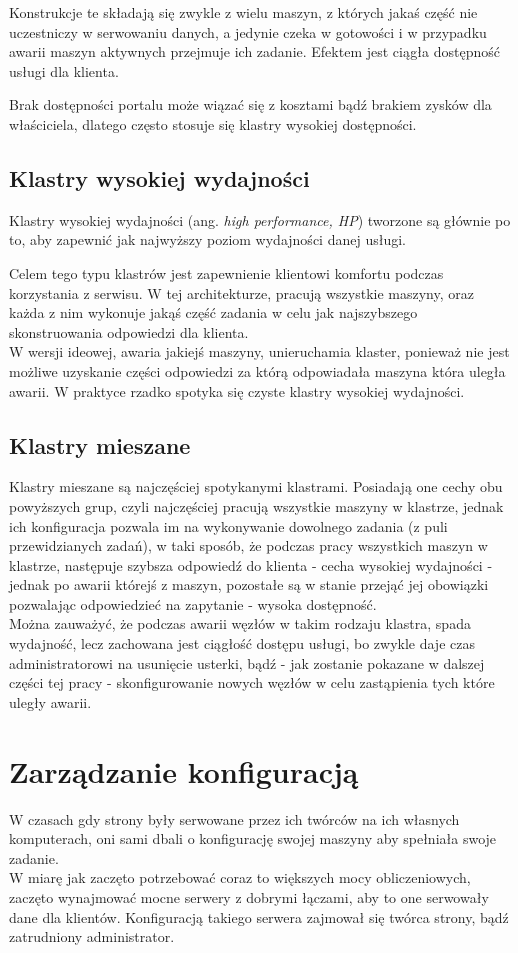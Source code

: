 Konstrukcje te składają się zwykle z wielu maszyn, z których jakaś część nie uczestniczy w serwowaniu danych, a jedynie czeka w gotowości i w przypadku awarii maszyn aktywnych przejmuje ich zadanie. Efektem jest ciągła dostępność usługi dla klienta.

Brak dostępności portalu może wiązać się z kosztami bądź brakiem zysków dla właściciela, dlatego często stosuje się klastry wysokiej dostępności.
\subsection{Klastry wysokiej wydajności}
Klastry wysokiej wydajności (ang. \textit{high performance, HP}) tworzone są głównie po to, aby zapewnić jak najwyższy poziom wydajności danej usługi.

Celem tego typu klastrów jest zapewnienie klientowi komfortu podczas korzystania z serwisu. W tej architekturze, pracują wszystkie maszyny, oraz każda z nim wykonuje jakąś część zadania w celu jak najszybszego skonstruowania odpowiedzi dla klienta.\\

W wersji ideowej, awaria jakiejś maszyny, unieruchamia klaster, ponieważ nie jest możliwe uzyskanie części odpowiedzi za którą odpowiadała maszyna która uległa awarii. W praktyce rzadko spotyka się czyste klastry wysokiej wydajności.
\subsection{Klastry mieszane}
Klastry mieszane są najczęściej spotykanymi klastrami. Posiadają one cechy obu powyższych grup, czyli najczęściej pracują wszystkie maszyny w klastrze, jednak ich konfiguracja pozwala im na wykonywanie dowolnego zadania (z puli przewidzianych zadań), w taki sposób, że podczas pracy wszystkich maszyn w klastrze, następuje szybsza odpowiedź do klienta - cecha wysokiej wydajności - jednak po awarii którejś z maszyn, pozostałe są w stanie przejąć jej obowiązki pozwalając odpowiedzieć na zapytanie - wysoka dostępność.\\
Można zauważyć, że podczas awarii węzłów w takim rodzaju klastra, spada wydajność, lecz zachowana jest ciągłość dostępu usługi, bo zwykle daje czas administratorowi na usunięcie usterki, bądź - jak zostanie pokazane w dalszej części tej pracy - skonfigurowanie nowych węzłów w celu zastąpienia tych które uległy awarii.
\section{Zarządzanie konfiguracją}
W czasach gdy strony były serwowane przez ich twórców na ich własnych komputerach, oni sami dbali o konfigurację swojej maszyny aby spełniała swoje zadanie.\\
W miarę jak zaczęto potrzebować coraz to większych mocy obliczeniowych, zaczęto wynajmować mocne serwery z dobrymi łączami, aby to one serwowały dane dla klientów.
Konfiguracją takiego serwera zajmował się twórca strony, bądź zatrudniony administrator.

